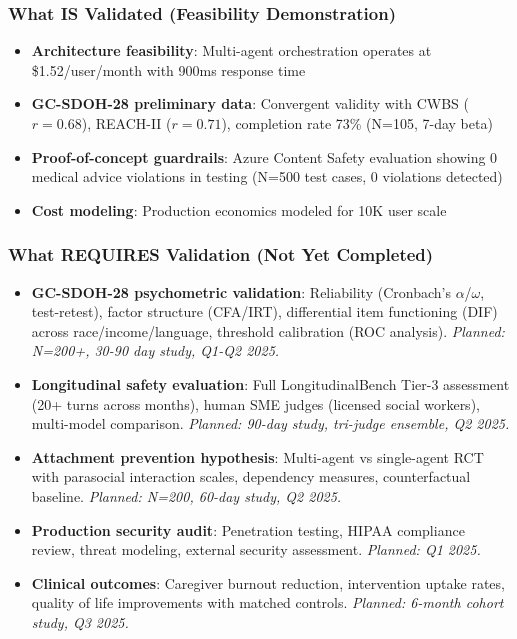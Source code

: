 \documentclass{article}
\begin{document}
\subsubsection{What IS Validated (Feasibility Demonstration)}

\begin{itemize}
    \item \textbf{Architecture feasibility}: Multi-agent orchestration operates at \$1.52/user/month with 900ms response time
    \item \textbf{GC-SDOH-28 preliminary data}: Convergent validity with CWBS ($r=0.68$), REACH-II ($r=0.71$), completion rate 73\% (N=105, 7-day beta)
    \item \textbf{Proof-of-concept guardrails}: Azure Content Safety evaluation showing 0 medical advice violations in testing (N=500 test cases, 0 violations detected)
    \item \textbf{Cost modeling}: Production economics modeled for 10K user scale
\end{itemize}

\subsubsection{What REQUIRES Validation (Not Yet Completed)}

\begin{itemize}
    \item \textbf{GC-SDOH-28 psychometric validation}: Reliability (Cronbach's $\alpha$/$\omega$, test-retest), factor structure (CFA/IRT), differential item functioning (DIF) across race/income/language, threshold calibration (ROC analysis). \textit{Planned: N=200+, 30-90 day study, Q1-Q2 2025.}
    \item \textbf{Longitudinal safety evaluation}: Full LongitudinalBench Tier-3 assessment (20+ turns across months), human SME judges (licensed social workers), multi-model comparison. \textit{Planned: 90-day study, tri-judge ensemble, Q2 2025.}
    \item \textbf{Attachment prevention hypothesis}: Multi-agent vs single-agent RCT with parasocial interaction scales, dependency measures, counterfactual baseline. \textit{Planned: N=200, 60-day study, Q2 2025.}
    \item \textbf{Production security audit}: Penetration testing, HIPAA compliance review, threat modeling, external security assessment. \textit{Planned: Q1 2025.}
    \item \textbf{Clinical outcomes}: Caregiver burnout reduction, intervention uptake rates, quality of life improvements with matched controls. \textit{Planned: 6-month cohort study, Q3 2025.}
\end{itemize}
\end{document}
